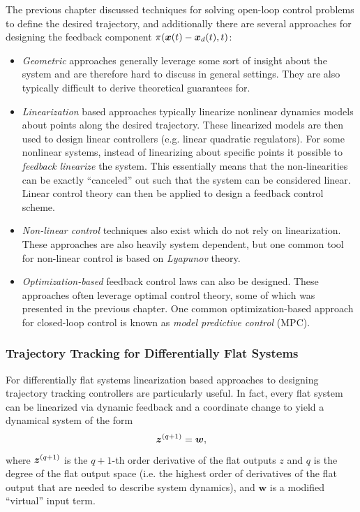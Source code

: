 The previous chapter discussed techniques for solving open-loop control problems to define the desired trajectory, and additionally there are several approaches for designing the feedback component $\pi(\bm{x}(t)-\bm{x}_d(t),t)$:
\begin{itemize}
  \item \textit{Geometric} approaches generally leverage some sort of insight about the system and are therefore hard to discuss in general settings. They are also typically difficult to derive theoretical guarantees for. 
  \item \textit{Linearization} based approaches typically linearize nonlinear dynamics models about points along the desired trajectory. These linearized models are then used to design linear controllers (e.g. linear quadratic regulators). For some nonlinear systems, instead of linearizing about specific points it possible to \textit{feedback linearize} the system. This essentially means that the non-linearities can be exactly ``canceled'' out such that the system can be considered linear. Linear control theory can then be applied to design a feedback control scheme.
  
  \item \textit{Non-linear control} techniques also exist which do not rely on linearization. These approaches are also heavily system dependent, but one common tool for non-linear control is based on \textit{Lyapunov} theory.

  \item \textit{Optimization-based} feedback control laws can also be designed. These approaches often leverage optimal control theory, some of which was presented in the previous chapter. One common optimization-based approach for closed-loop control is known as \textit{model predictive control} (MPC).
\end{itemize}

\subsubsection{Trajectory Tracking for Differentially Flat Systems}
For differentially flat systems linearization based approaches to designing trajectory tracking controllers are particularly useful\cite{Levine2009}. In fact, every flat system can be linearized via dynamic feedback and a coordinate change to yield a dynamical system of the form
\begin{equation} \label{eq:diff_flat_linearized}
    \bm{z}^{(q+1)} = \bm{w}, 
\end{equation}
where $\bm{z}^{(q+1)}$ is the $q+1$-th order derivative of the flat outputs $z$ and $q$ is the degree of the flat output space (i.e. the highest order of derivatives of the flat output that are needed to describe system dynamics), and $\bm{w}$ is a modified ``virtual'' input term.

